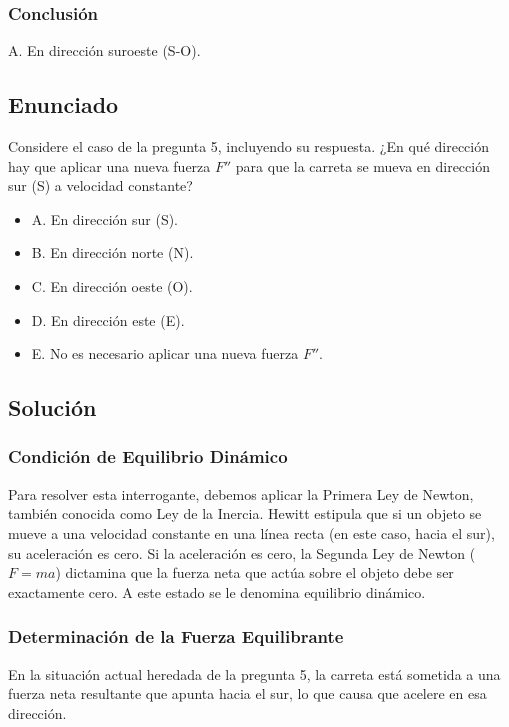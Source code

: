 \documentclass[12pt, a4paper]{article}
\begin{document}
\subsubsection*{Conclusión}

A. En dirección suroeste (S-O).

\newpage
\subsection*{Enunciado}
Considere el caso de la pregunta 5, incluyendo su respuesta. ¿En qué dirección hay que aplicar una nueva fuerza $F''$ para que la carreta se mueva en dirección sur (S) a velocidad constante?

\begin{itemize}
    \item A. En dirección sur (S).
    \item B. En dirección norte (N).
    \item C. En dirección oeste (O).
    \item D. En dirección este (E).
    \item E. No es necesario aplicar una nueva fuerza $F''$.
\end{itemize}

\subsection*{Solución}

\subsubsection*{Condición de Equilibrio Dinámico}

Para resolver esta interrogante, debemos aplicar la Primera Ley de Newton, también conocida como Ley de la Inercia. Hewitt estipula que si un objeto se mueve a una velocidad constante en una línea recta (en este caso, hacia el sur), su aceleración es cero. Si la aceleración es cero, la Segunda Ley de Newton ($F = ma$) dictamina que la fuerza neta que actúa sobre el objeto debe ser exactamente cero. A este estado se le denomina equilibrio dinámico.

\subsubsection*{Determinación de la Fuerza Equilibrante}

En la situación actual heredada de la pregunta 5, la carreta está sometida a una fuerza neta resultante que apunta hacia el sur, lo que causa que acelere en esa dirección. 
\end{document}

